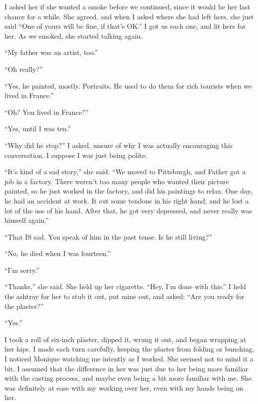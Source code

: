 I asked her if she wanted a smoke before we continued, since it would be her last chance for
a while. She agreed, and when I asked where she had left hers, she just said ``One of yours will
be fine, if that's OK.'' I got us each one, and lit hers for her. As we smoked, she started
talking again.

``My father was an artist, too.''

``Oh really?''

``Yes, he painted, mostly. Portraits. He used to do them for rich tourists when we lived in
France.''

``Oh? You lived in France?''

``Yes, until I was ten.''

``Why did he stop?'' I asked, unsure of why I was actually encouraging this conversation. I
suppose I was just being polite.

``It's kind of a sad story,'' she said. ``We moved to Pittsburgh, and Father got a job in a
factory. There weren't too many people who wanted their picture painted, so he just worked in
the factory, and did his paintings to relax. One day, he had an accident at work. It cut some
tendons in his right hand, and he lost a lot of the use of his hand. After that, he got very
depressed, and never really was himself again.''

``That IS sad. You speak of him in the past tense. Is he still living?''

``No, he died when I was fourteen.''

``I'm sorry.''

``Thanks,'' she said. She held up her cigarette. ``Hey, I'm done with this.'' I held the ashtray
for her to stub it out, put mine out, and asked: ``Are you ready for the plaster?''

``Yes.'' 

I took a roll of six-inch plaster, dipped it, wrung it out, and began wrapping at her hips.
I made each turn carefully, keeping the plaster from folding or bunching. I noticed Monique
watching me intently as I worked. She seemed not to mind it a bit. I assumed that the difference
in her was just due to her being more familiar with the casting process, and maybe even being a
bit more familiar with me. She was definitely at ease with my working over her, even with my
hands being on her.

